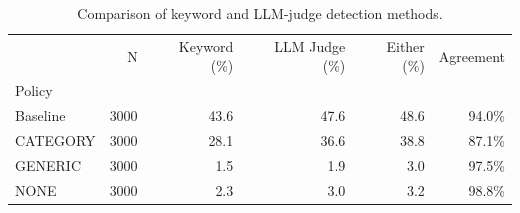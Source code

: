\begin{table}
\caption{Comparison of keyword and LLM-judge detection methods.}
\label{tab:detection}
\begin{tabular}{lrrrrr}
\toprule
 & N & Keyword (\%) & LLM Judge (\%) & Either (\%) & Agreement \\
Policy &  &  &  &  &  \\
\midrule
Baseline & 3000 & 43.6 & 47.6 & 48.6 & 94.0\% \\
CATEGORY & 3000 & 28.1 & 36.6 & 38.8 & 87.1\% \\
GENERIC & 3000 & 1.5 & 1.9 & 3.0 & 97.5\% \\
NONE & 3000 & 2.3 & 3.0 & 3.2 & 98.8\% \\
\bottomrule
\end{tabular}
\end{table}
